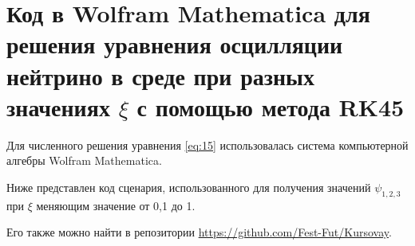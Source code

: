 \section{Код в Wolfram Mathematica для решения уравнения осцилляции нейтрино в среде при разных значениях \(\xi\) с помощью метода RK45}
\label{app: code-python-vis}

Для численного решения уравнения \eqref{eq:15} использовалась система компьютерной алгебры \textsf{Wolfram Mathematica}. 


Ниже представлен код сценария, использованного для получения значений \(\psi_{1,2,3}\) при \(\xi\) меняющим значение от 0,1 до 1.

Его также можно найти в репозитории \url{https://github.com/Fest-Fut/Kursovay}.

\inputminted[linenos,breaklines,fontsize=\scriptsize]{Markdown}{Sun RKF.md}

